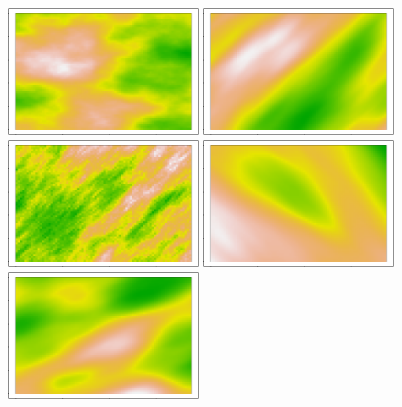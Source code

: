 \documentclass[article,nojss]{jss}\usepackage[]{graphicx}\usepackage[]{color}
\newenvironment{knitrout}{}{} %
\begin{document}
\begin{figure}[H]
\begin{knitrout}
\includegraphics[width=0.45\textwidth]{figure/maternplot-6} 
\includegraphics[width=0.45\textwidth]{figure/maternplot-7} 
\includegraphics[width=0.45\textwidth]{figure/maternplot-8} 
\includegraphics[width=0.45\textwidth]{figure/maternplot-9} 
\includegraphics[width=0.45\textwidth]{figure/maternplot-10} 
\end{knitrout}
\caption{\label{fig:5} }
\end{figure}
\end{document}
